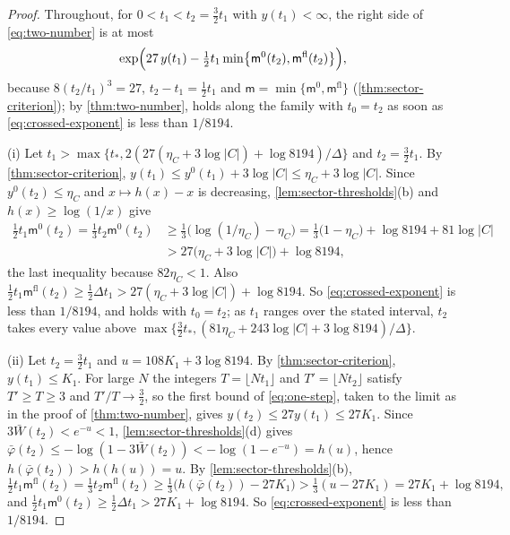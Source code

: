 \documentclass[11pt,a4paper]{amsart}
\theoremstyle{definition}
\theoremstyle{remark}
\numberwithin{equation}{section}
\newcommand{\abs}[1]{\lvert #1\rvert}      %
\newcommand{\Mcirc}{\text{\upshape(M$^{\circ}$)}}   %
\newcommand{\tzero}{t_0}                   %
\begin{document}
\begin{proof}
Throughout, for $0<t_1<t_2=\frac32t_1$ with $y(t_1)<\infty$, the right side of \eqref{eq:two-number} is at most
\begin{equation}\label{eq:crossed-exponent}
\exp\Bigl(27\,y(t_1)-\tfrac12t_1\min\bigl\{\mathsf m^0(t_2),\mathsf m^{\mathrm{fl}}(t_2)\bigr\}\Bigr),
\end{equation}
because $8(t_2/t_1)^3=27$, $t_2-t_1=\frac12t_1$ and $\mathsf m=\min\{\mathsf m^0,\mathsf m^{\mathrm{fl}}\}$ (\cref{thm:sector-criterion}); by \cref{thm:two-number}, \Mcirc{} holds along the family with $\tzero=t_2$ as soon as \eqref{eq:crossed-exponent} is less than $1/8194$.

(i) Let $t_1>\max\{t_*,2(27(\eta_C+3\log\abs{C})+\log8194)/\Delta\}$ and $t_2=\frac32t_1$. By \cref{thm:sector-criterion}, $y(t_1)\le y^0(t_1)+3\log\abs{C}\le\eta_C+3\log\abs{C}$. Since $y^0(t_2)\le\eta_C$ and $x\mapsto h(x)-x$ is decreasing, \cref{lem:sector-thresholds}\textup{(b)} and $h(x)\ge\log(1/x)$ give
\begin{align*}
\tfrac12t_1\mathsf m^0(t_2)=\tfrac13t_2\mathsf m^0(t_2)&\ge\tfrac13\bigl(\log(1/\eta_C)-\eta_C\bigr)=\tfrac13\bigl(1-\eta_C\bigr)+\log8194+81\log\abs{C}\\
&>27\bigl(\eta_C+3\log\abs{C}\bigr)+\log8194,
\end{align*}
the last inequality because $82\eta_C<1$. Also $\frac12t_1\mathsf m^{\mathrm{fl}}(t_2)\ge\frac12\Delta t_1>27(\eta_C+3\log\abs{C})+\log8194$. So \eqref{eq:crossed-exponent} is less than $1/8194$, and \Mcirc{} holds with $\tzero=t_2$; as $t_1$ ranges over the stated interval, $t_2$ takes every value above $\max\{\frac32t_*,(81\eta_C+243\log\abs{C}+3\log8194)/\Delta\}$.

(ii) Let $t_2=\frac32t_1$ and $u=108K_1+3\log8194$. By \cref{thm:sector-criterion}, $y(t_1)\le K_1$. For large $N$ the integers $T=\lfloor Nt_1\rfloor$ and $T'=\lfloor Nt_2\rfloor$ satisfy $T'\ge T\ge3$ and $T'/T\to\frac32$, so the first bound of \eqref{eq:one-step}, taken to the limit as in the proof of \cref{thm:two-number}, gives $y(t_2)\le27y(t_1)\le27K_1$. Since $3\bar W(t_2)<e^{-u}<1$, \cref{lem:sector-thresholds}\textup{(d)} gives $\bar\varphi(t_2)\le-\log(1-3\bar W(t_2))<-\log(1-e^{-u})=h(u)$, hence $h(\bar\varphi(t_2))>h(h(u))=u$. By \cref{lem:sector-thresholds}\textup{(b)},
\[
\tfrac12t_1\mathsf m^{\mathrm{fl}}(t_2)=\tfrac13t_2\mathsf m^{\mathrm{fl}}(t_2)\ge\tfrac13\bigl(h(\bar\varphi(t_2))-27K_1\bigr)>\tfrac13(u-27K_1)=27K_1+\log8194,
\]
and $\frac12t_1\mathsf m^0(t_2)\ge\frac12\Delta t_1>27K_1+\log8194$. So \eqref{eq:crossed-exponent} is less than $1/8194$.


\end{proof}
\end{document}
